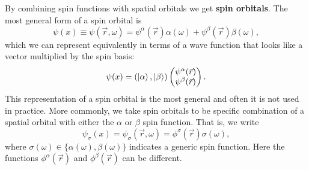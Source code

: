 \documentclass[../Main/chem532-notes.tex]{subfiles}
\begin{document}
By combining spin functions with spatial orbitals we get \textbf{spin orbitals}. The most general form of a spin orbital is
\begin{equation}
\psi (x) \equiv \psi(\vec{r},\omega) = \psi^{\alpha}(\vec{r}) \alpha(\omega) + \psi^{\beta}(\vec{r}) \beta(\omega),
\end{equation}
which we can represent equivalently in terms of a wave function that looks like a vector multiplied by the spin basis:
\begin{equation}
\psi (x) = (\ket{\alpha}, \ket{\beta})
\begin{pmatrix}
\psi^{\alpha}(\vec{r})  \\
  \psi^{\beta}(\vec{r})
\end{pmatrix}.
\end{equation}
This representation of a spin orbital is the most general and often it is not used in practice. 
More commonly, we take spin orbitals to be specific combination of a spatial orbital with either the $\alpha$ or $\beta$ spin function.
That is, we write
\begin{equation}
\psi_{\sigma} (x) = \psi_{\sigma} (\vec{r},\omega) = \phi^\sigma(\vec{r}) \sigma(\omega),
\end{equation}
where $\sigma(\omega) \in \{\alpha(\omega),\beta(\omega)\}$ indicates a generic spin function.
Here the functions $\phi^\alpha(\vec{r})$ and $\phi^\beta(\vec{r})$ can be different.
\end{document}
